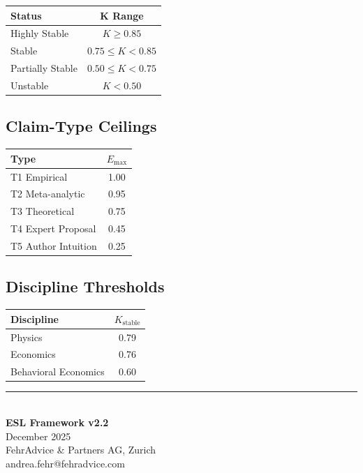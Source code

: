 \documentclass[11pt,a4paper]{article}
\begin{document}
\begin{center}
\begin{tabular}{lc}
\toprule
\textbf{Status} & \textbf{K Range} \\
\midrule
Highly Stable & $K \geq 0.85$ \\
Stable & $0.75 \leq K < 0.85$ \\
Partially Stable & $0.50 \leq K < 0.75$ \\
Unstable & $K < 0.50$ \\
\bottomrule
\end{tabular}
\end{center}

\subsection{Claim-Type Ceilings}

\begin{center}
\begin{tabular}{lc}
\toprule
\textbf{Type} & \textbf{$E_{\max}$} \\
\midrule
T1 Empirical & 1.00 \\
T2 Meta-analytic & 0.95 \\
T3 Theoretical & 0.75 \\
T4 Expert Proposal & 0.45 \\
T5 Author Intuition & 0.25 \\
\bottomrule
\end{tabular}
\end{center}

\subsection{Discipline Thresholds}

\begin{center}
\begin{tabular}{lc}
\toprule
\textbf{Discipline} & \textbf{$K_{\text{stable}}$} \\
\midrule
Physics & 0.79 \\
Economics & 0.76 \\
Behavioral Economics & 0.60 \\
\bottomrule
\end{tabular}
\end{center}

\vspace{2em}
\begin{center}
\rule{8cm}{0.4pt}\\[1em]
\textbf{ESL Framework v2.2}\\
December 2025\\[0.5em]
FehrAdvice \& Partners AG, Zurich\\
andrea.fehr@fehradvice.com
\end{center}
\end{document}

